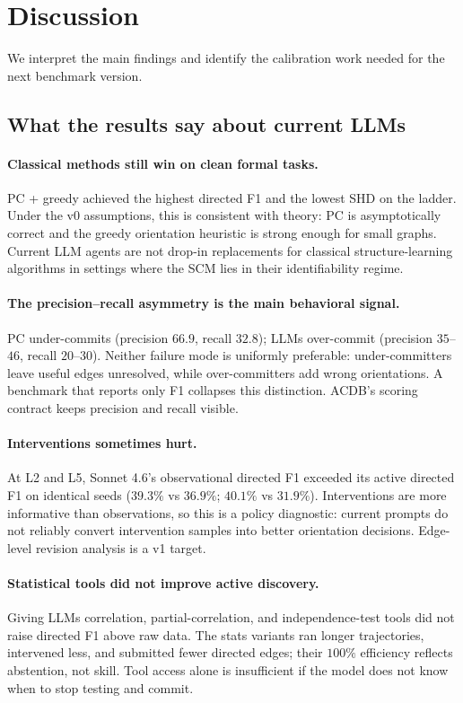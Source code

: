 \section{Discussion}
\label{sec:discussion}

We interpret the main findings and identify the calibration work needed for the next benchmark version.

\subsection{What the results say about current LLMs}

\paragraph{Classical methods still win on clean formal tasks.} PC + greedy achieved the highest directed F1 and the lowest SHD on the ladder. Under the v0 assumptions, this is consistent with theory: PC is asymptotically correct and the greedy orientation heuristic is strong enough for small graphs. Current LLM agents are not drop-in replacements for classical structure-learning algorithms in settings where the SCM lies in their identifiability regime.

\paragraph{The precision--recall asymmetry is the main behavioral signal.} PC under-commits (precision $66.9$, recall $32.8$); LLMs over-commit (precision $35$--$46$, recall $20$--$30$). Neither failure mode is uniformly preferable: under-committers leave useful edges unresolved, while over-committers add wrong orientations. A benchmark that reports only F1 collapses this distinction. ACDB's scoring contract keeps precision and recall visible.

\paragraph{Interventions sometimes hurt.} At L2 and L5, Sonnet 4.6's observational directed F1 exceeded its active directed F1 on identical seeds ($39.3\%$ vs $36.9\%$; $40.1\%$ vs $31.9\%$). Interventions are more informative than observations, so this is a policy diagnostic: current prompts do not reliably convert intervention samples into better orientation decisions. Edge-level revision analysis is a v1 target.

\paragraph{Statistical tools did not improve active discovery.} Giving LLMs correlation, partial-correlation, and independence-test tools did not raise directed F1 above raw data. The stats variants ran longer trajectories, intervened less, and submitted fewer directed edges; their $100\%$ efficiency reflects abstention, not skill. Tool access alone is insufficient if the model does not know when to stop testing and commit.

